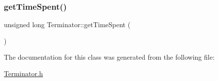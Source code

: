 \subsubsection{\texorpdfstring{get\+Time\+Spent()}{getTimeSpent()}}
{\footnotesize\ttfamily unsigned long Terminator\+::get\+Time\+Spent (\begin{DoxyParamCaption}{ }\end{DoxyParamCaption})}



The documentation for this class was generated from the following file\+:\begin{DoxyCompactItemize}
\item 
\hyperlink{Terminator_8h}{Terminator.\+h}\end{DoxyCompactItemize}
